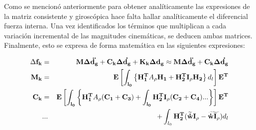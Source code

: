 Como se mencionó anteriormente para obtener analíticamente las expresiones de la matriz consistente y giroscópica hace falta hallar analíticamente el diferencial fuerza interna. Una vez identificados los términos que multiplican a cada variación incremental de las magnitudes cinemáticas, se deducen ambas matrices. Finalmente, esto se expresa de forma matemática en las siguientes expresiones:

\begin{eqnarray}
	\Delta \bf{f_k}&= &\bf{M} \Delta \ddot{\bf{d}_g}+\bf{C}_k \Delta \dot{\bf{d}_g}+\bf{K}_k \Delta \bf{d}_g\approx \bf{M} \Delta \ddot{\bf{d}_g}+\bf{C}_k \Delta \dot{\bf{d}_g}\\
	\label{Eqn:PRE:MatrizM}
	\bf{M_k}&=&\bf{E}\left [ \int _{l_0} \left \{ \bf{H}_1^T \text{$A_\rho$}\bf{H}_1 +\bf{H}_2^T\bf{I}_\rho\bf{H_2} \right \} \text{$d_l$} \right  ]\bf{E}^T\\
	\label{Eqn:PRE:MtarizC}
	\bf{C}_k&=&\bf{E}\left [ \int _{l_0} \left \{ \bf{H}_1^T \text{$A_\rho$}(\bf{C}_1+\bf{C}_3) +\int _{l_0}\bf{H}_2^T\bf{I}_\rho(\bf{C}_2+\bf{C}_4) ...\right \}\right  ]\bf{E}^T\\
	&...& +\int_{l_0} \bf{H}_2 ^T(\widetilde{\dot{w}}\bf{I}_\rho-\widetilde{\dot{w}\bf{I}_\rho}) \text{$d_l$}
\end{eqnarray}

\newpage

